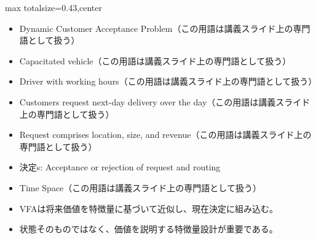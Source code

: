 \clearpage
{}
\begin{minipage}[t]{0.405\textwidth}
\begin{adjustbox}{max totalsize={\textwidth}{0.43\textheight},center}
\begin{minipage}{\textwidth}\scriptsize
{}\begin{itemize}
\item Dynamic Customer Acceptance Problem（この用語は講義スライド上の専門語として扱う）
\item Capacitated vehicle（この用語は講義スライド上の専門語として扱う）
\item Driver with working hours（この用語は講義スライド上の専門語として扱う）
\item Customers request next-day delivery over the day（この用語は講義スライド上の専門語として扱う）
\item Request comprises location, size, and revenue（この用語は講義スライド上の専門語として扱う）
\item 決定s: Acceptance or rejection of request and routing
\item Time Space（この用語は講義スライド上の専門語として扱う）
\end{itemize}\begin{itemize}
\item VFAは将来価値を特徴量に基づいて近似し、現在決定に組み込む。
\item 状態そのものではなく、価値を説明する特徴量設計が重要である。
\end{itemize}
\end{minipage}
\end{adjustbox}
\end{minipage}\hfill
